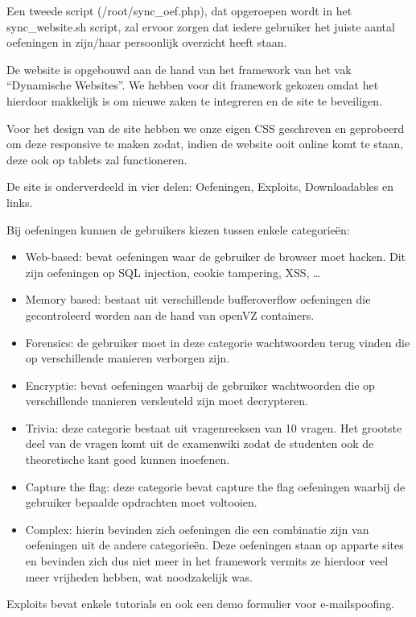 Een tweede script (/root/sync\_oef.php), dat opgeroepen wordt in het sync\_website.sh script, zal ervoor zorgen dat iedere gebruiker het juiste aantal oefeningen in zijn/haar persoonlijk overzicht heeft staan.

De website is opgebouwd aan de hand van het framework van het vak ``Dynamische Websites''. We hebben voor dit framework gekozen omdat het hierdoor makkelijk is om nieuwe zaken te integreren en de site te beveiligen.

Voor het design van de site hebben we onze eigen CSS geschreven en geprobeerd om deze responsive te maken zodat, indien de website ooit online komt te staan, deze ook op tablets zal functioneren.

De site is onderverdeeld in vier delen: Oefeningen, Exploits, Downloadables en links.

Bij oefeningen kunnen de gebruikers kiezen tussen enkele categorie\"en:
\begin{itemize}
\item Web-based: bevat oefeningen waar de gebruiker de browser moet hacken. Dit zijn oefeningen op SQL injection, cookie tampering, XSS, \ldots
\item Memory based: bestaat uit verschillende bufferoverflow oefeningen die gecontroleerd worden aan de hand van openVZ containers.
\item Forensics: de gebruiker moet in deze categorie wachtwoorden terug vinden die op verschillende manieren verborgen zijn.
\item Encryptie: bevat oefeningen waarbij de gebruiker wachtwoorden die op verschillende manieren versleuteld zijn moet decrypteren.
\item Trivia: deze categorie bestaat uit vragenreeksen van 10 vragen. Het grootste deel van de vragen komt uit de examenwiki zodat de studenten ook de theoretische kant goed kunnen inoefenen.
\item Capture the flag: deze categorie bevat capture the flag oefeningen waarbij de gebruiker bepaalde opdrachten moet voltooien.
\item Complex: hierin bevinden zich oefeningen die een combinatie zijn van oefeningen uit de andere categorie\"en. Deze oefeningen staan op apparte sites en bevinden zich dus niet meer in het framework vermits ze hierdoor veel meer vrijheden hebben, wat noodzakelijk was.
\end{itemize}

Exploits bevat enkele tutorials en ook een demo formulier voor e-mailspoofing.

